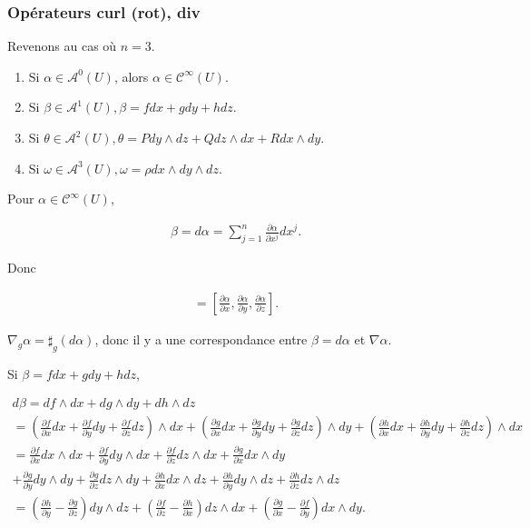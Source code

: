 \documentclass[french]{article}
\theoremstyle{definition}
\begin{document}
\subsubsection{Opérateurs curl (rot), div}

Revenons au cas où \(n=3\).

\begin{enumerate}
  \item Si \(\alpha \in \mathscr{A}^{0}(U)\), alors \(\alpha \in \mathcal{C}^{\infty}(U)\).
  \item Si \(\beta \in \mathscr{A}^{1}(U), \beta = f dx + g dy + h dz\).
  \item Si \(\theta \in \mathscr{A}^2(U), \theta = P dy \wedge dz + Q dz \wedge dx + R dx \wedge dy\).
  \item Si \(\omega \in \mathscr{A}^3(U), \omega = \rho d x \wedge dy \wedge dz\).
\end{enumerate}

Pour \(\alpha \in \mathcal{C}^{\infty}(U)\),

\begin{gather*}
  \beta = d \alpha = \displaystyle \sum_{j=1}^{n}\displaystyle \frac{\partial \alpha }{\partial x ^{j}}d x^{j}.
\end{gather*}

Donc

\begin{gather*}
  [f \ g \ h] = \left[ \frac{\partial  \alpha}{\partial x}, \frac{\partial \alpha }{\partial y}, \frac{\partial \alpha }{\partial z}  \right].
\end{gather*}

\(\nabla_g \alpha = \sharp_g(d \alpha)\), donc il y a une correspondance entre \(\beta = d \alpha\) et \(\nabla \alpha\).

Si \(\beta = f dx + g dy + h dz\),

\begin{gather*}
  d \beta = df \wedge dx  + dg \wedge dy + dh \wedge dz \\
  = \left(\frac{\partial f }{\partial x}dx + \frac{\partial f }{\partial y} dy + \frac{\partial f }{\partial z} dz   \right)\wedge dx + \left(\frac{\partial g }{\partial x}dx + \frac{\partial g }{\partial y} dy + \frac{\partial g }{\partial z} dz   \right)\wedge dy + \left(\frac{\partial h }{\partial x}dx + \frac{\partial h }{\partial y} dy + \frac{\partial h }{\partial z} dz   \right)\wedge dx\\
   = \frac{\partial f }{\partial x }d x \wedge dx + \frac{\partial f }{\partial y }d y \wedge dx + \frac{\partial f }{\partial z }d z \wedge dx  + \frac{\partial g }{\partial x }d x \wedge dy\\
    + \frac{\partial g }{\partial y }d y \wedge d y + \frac{\partial g }{\partial z }d z \wedge dy + \frac{\partial h }{\partial x }d x \wedge d z + \frac{\partial h }{\partial y}d y \wedge dz  + \frac{\partial h }{\partial z }d z \wedge dz \\
   = \left(\frac{\partial h }{\partial y}- \frac{\partial g }{\partial z}  \right) dy \wedge dz + \left(\frac{\partial f}{\partial z}- \frac{\partial h }{\partial x}  \right) dz \wedge dx + \left(\frac{\partial g}{\partial x}- \frac{\partial f }{\partial y}  \right) dx \wedge dy.
\end{gather*}
\end{document}
